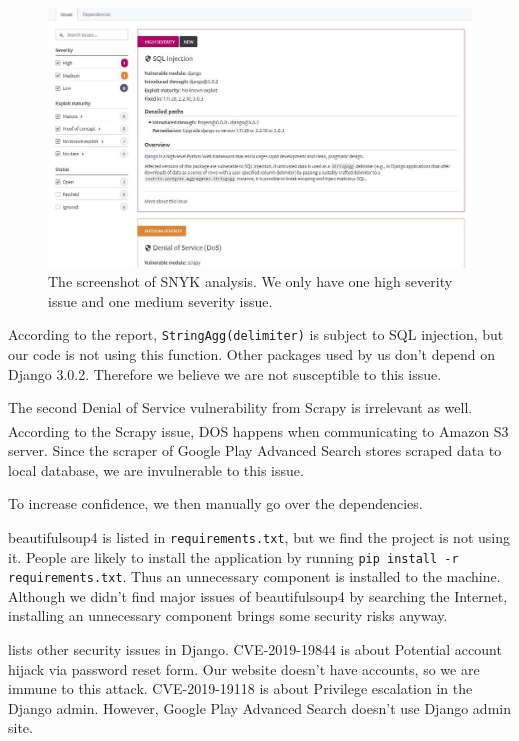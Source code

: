 \documentclass[12pt, a4paper]{article}
\newcommand{\code}[1]{\texttt{#1}}
\begin{document}
\begin{figure}[ht]
\centering
\includegraphics[width=\textwidth]{snyk.JPG}
\caption{The screenshot of SNYK analysis. We only have one high severity issue and one medium severity issue.}
\label{fig:snyk}
\end{figure}

According to the report, \code{StringAgg(delimiter)} is subject to SQL injection, but our code is not using this function. Other packages used by us don't depend on Django 3.0.2. Therefore we believe we are not susceptible to this issue.

The second Denial of Service vulnerability from Scrapy is irrelevant as well. According to the Scrapy issue\textsuperscript{\cite{scrapy-s3}}, DOS happens when communicating to Amazon S3 server. Since the scraper of Google Play Advanced Search stores scraped data to local database, we are invulnerable to this issue.


To increase confidence, we then manually go over the dependencies.

beautifulsoup4 is listed in \code{requirements.txt}, but we find the project is not using it. People are likely to install the application by running \code{pip install -r requirements.txt}. Thus an unnecessary component is installed to the machine. Although we didn't find major issues of beautifulsoup4 by searching the Internet, installing an unnecessary component brings some security risks anyway.


\cite{django-security-issues} lists other security issues in Django. CVE-2019-19844 is about Potential account hijack via password reset form. Our website doesn't have accounts, so we are immune to this attack. CVE-2019-19118 is about Privilege escalation in the Django admin. However, Google Play Advanced Search doesn't use Django admin site.
\end{document}
